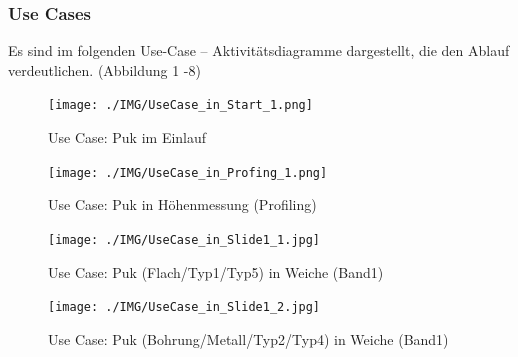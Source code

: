 \documentclass[
   draft=false
  ,paper=a4
  ,twoside=true
  ,fontsize=11pt
  ,headsepline
  ,DIV11
  ,parskip=full+
]{scrartcl} %
\begin{document}
\subsubsection{Use Cases}
Es sind im folgenden Use-Case -- Aktivitätsdiagramme dargestellt, die den Ablauf verdeutlichen. (Abbildung 1 -8)

\begin{figure}[H]
	\label{fig:uc1start}
  	\centering
    \texttt{[image: ./IMG/UseCase\_in\_Start\_1.png]}
    \caption[short Name]{Use Case: Puk im Einlauf}
\end{figure}

\begin{figure}[H]
	\begin{addmargin*}[0cm]{-0.15\textwidth}
	\label{fig:uc2profiling}
  	\centering
    \texttt{[image: ./IMG/UseCase\_in\_Profing\_1.png]}
    \caption[short Name]{Use Case: Puk in Höhenmessung (Profiling)}
\end{addmargin*}
\end{figure}

\begin{figure}[H]
\begin{addmargin*}[-2.25cm]{0.1\textwidth}
	\label{fig:uc3slide}
  	\centering
    \texttt{[image: ./IMG/UseCase\_in\_Slide1\_1.jpg]}
    \caption[short Name]{Use Case: Puk (Flach/Typ1/Typ5) in Weiche (Band1)}
\end{addmargin*}
\end{figure}

\begin{figure}[H]
\begin{addmargin*}[-2.25cm]{0.1\textwidth}
	\label{fig:uc3slide}
  	\centering
    \texttt{[image: ./IMG/UseCase\_in\_Slide1\_2.jpg]}
    \caption[short Name]{Use Case: Puk (Bohrung/Metall/Typ2/Typ4) in Weiche (Band1)}
\end{addmargin*}
\end{figure}
\end{document}
